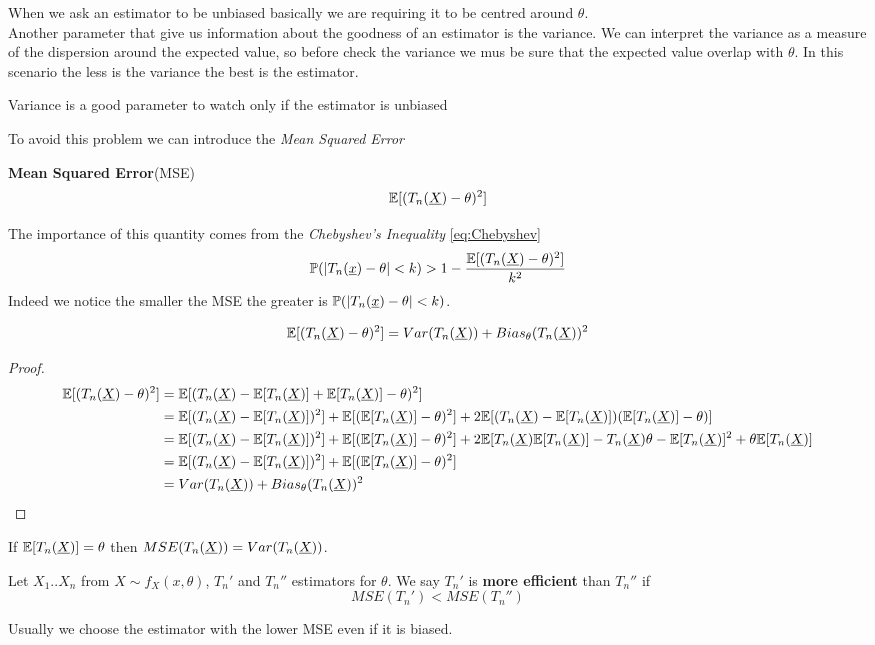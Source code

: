 When we ask an estimator to be unbiased basically we are requiring it to be centred around $\theta$.\\
Another parameter that give us information about the goodness of an estimator is the variance. We can interpret the variance as a measure of the dispersion around the expected value, so before check the variance we mus be sure that the expected value overlap with $\theta$. In this scenario the less is the variance the best is the estimator.
\begin{oss}
	Variance is a good parameter to watch only if the estimator is unbiased
\end{oss}
To avoid this problem we can introduce the \textit{Mean Squared Error}
\begin{defi}\textbf{Mean Squared Error}(MSE)
	\[
	\mathbb{E}[(T_n(\underline X)-\theta)^2]
	\]
\end{defi}
The importance of this quantity comes from the \textit{Chebyshev's Inequality} \ref{eq:Chebyshev}
\[
\mathbb{P}(|T_n(\underline x)-\theta|< k)>1-\frac{\mathbb{E}[(T_n(\underline X)-\theta)^2]}{k^2}
\]
Indeed we notice the smaller the MSE the greater is $\mathbb{P}(|T_n(\underline x)-\theta|< k)$.
\begin{prop}
	$$\mathbb{E}[(T_n(\underline X)-\theta)^2]=Var(T_n(\underline X))+Bias_\theta(T_n(\underline X))^2$$
\end{prop}
\begin{proof}
	\[
	\begin{split}
		\mathbb{E}[(T_n(\underline X)-\theta)^2]
		&=\mathbb{E}[(T_n(\underline X) - \mathbb{E}[T_n(\underline X)] + \mathbb{E}[T_n(\underline X)]-\theta)^2 ]\\
		&=\mathbb{E}[(T_n(\underline X)-\mathbb{E}[T_n(\underline X)])^2]+\mathbb{E}[(\mathbb{E}[T_n(\underline X)]-\theta)^2]+2\mathbb{E}[(T_n(\underline X)-\mathbb{E}[T_n(\underline X)])(\mathbb{E}[T_n(\underline X)]-\theta)]\\
		&=\mathbb{E}[(T_n(\underline X)-\mathbb{E}[T_n(\underline X)])^2]+\mathbb{E}[(\mathbb{E}[T_n(\underline X)]-\theta)^2]+2\mathbb{E}[ T_{n}(\underline X)\mathbb{E}[T_{n}(\underline X)] - T_{n}(\underline X)\theta - \mathbb{E}[T_{n}(\underline X)]^2 + \theta \mathbb{E}[T_{n}(\underline X)]\\
		&=\mathbb{E}[(T_n(\underline X)-\mathbb{E}[T_n(\underline X)])^2]+\mathbb{E}[(\mathbb{E}[T_n(\underline X)]-\theta)^2]\\
		&=Var(T_n(\underline X))+Bias_\theta(T_n(\underline X))^2
	\end{split}
	\]
\end{proof}
\begin{oss}
	If $\mathbb{E}[T_n(\underline X)]=\theta$ then $MSE(T_n(\underline X))=Var(T_n(\underline X))$.
\end{oss}
\begin{defi}
	Let $X_1.. X_n$ from $X\sim f_X(x,\theta)$, $T_n'$ and $T_n''$ estimators for $\theta$. We say $T_n'$ is  \textbf{more efficient} than $T_n''$ if
	$$MSE(T_n')<MSE(T_n'')$$
\end{defi}
Usually we choose the estimator with the lower MSE even if it is biased.\\

